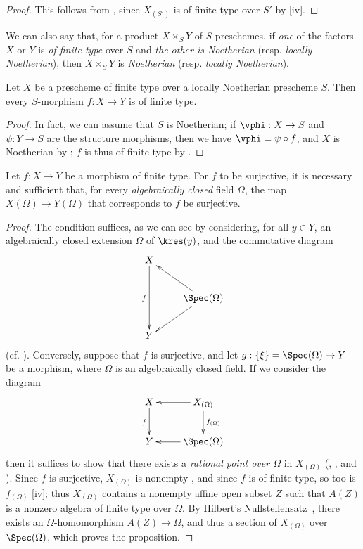 \begin{proof}
This follows from , since $X_{(S')}$ is of finite type over $S'$ by [iv].
\end{proof}

We can also say that, for a product $X\times_S Y$ of $S$-preschemes, if \emph{one} of the factors
$X$ or $Y$ is \emph{of finite type} over $S$ and \emph{the other is Noetherian} (resp. \emph{locally Noetherian}), then $X\times_S Y$ is \emph{Noetherian} (resp. \emph{locally Noetherian}).

\begin{corollary}[6.3.9]
\label{I.6.3.9}
Let $X$ be a prescheme of finite type over a locally Noetherian prescheme $S$.
Then every $S$-morphism $f:X\to Y$ is of finite type.
\end{corollary}

\begin{proof}
In fact, we can assume that $S$ is Noetherian;
if $\vphi:X\to S$ and $\psi:Y\to S$ are the structure morphisms, then we have $\vphi=\psi\circ f$, and $X$ is Noetherian by ;
$f$ is thus of finite type by .
\end{proof}

\begin{proposition}[6.3.10]
\label{I.6.3.10}
Let $f:X\to Y$ be a morphism of finite type.
For $f$ to be surjective, it is necessary and sufficient that, for every \emph{algebraically closed} field $\Omega$, the map $X(\Omega)\to Y(\Omega)$ that corresponds to $f$  be surjective.
\end{proposition}

\begin{proof}
The condition suffices, as we can see by considering, for all $y\in Y$, an algebraically closed extension $\Omega$ of $\kres(y)$, and the commutative diagram
\[
  \xymatrix{
    X\ar[dd]_f\\
    & \Spec(\Omega)\ar[ul]\ar[dl]\\
    Y
  }
\]
(cf. ).
Conversely, suppose that $f$ is surjective, and let $g:\{\xi\}=\Spec(\Omega)\to Y$ be a morphism, where $\Omega$ is an algebraically closed field.
If we consider the diagram
\[
  \xymatrix{
    X\ar[d]_f &
    X_{(\Omega)}\ar[l]\ar[d]^{f_{(\Omega)}}\\
    Y &
    \Spec(\Omega)\ar[l]
  }
\]
then it suffices to show that there exists a \emph{rational point over $\Omega$} in $X_{(\Omega)}$ (, , and ).
Since $f$ is surjective, $X_{(\Omega)}$ is nonempty , and since $f$ is of finite type, so too is $f_{(\Omega)}$ [iv];
thus $X_{(\Omega)}$ contains a nonempty affine open subset $Z$ such that $A(Z)$ is a nonzero algebra of finite type over $\Omega$.
By Hilbert's Nullstellensatz~\cite{I-21}, there exists an $\Omega$-homomorphism $A(Z)\to\Omega$, and thus a section of $X_{(\Omega)}$ over $\Spec(\Omega)$, which proves the proposition.
\end{proof}

